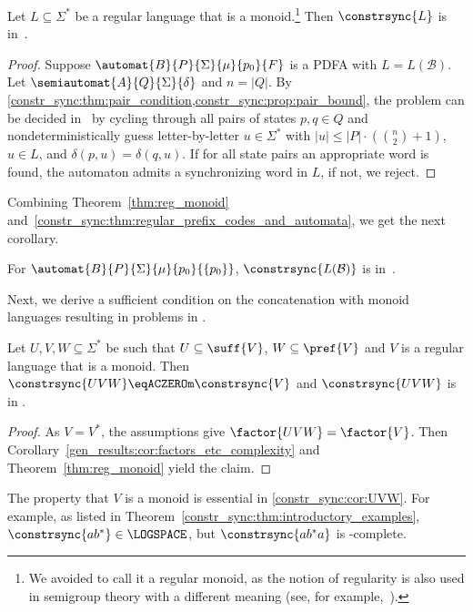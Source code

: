 \begin{theorem}
	\label{thm:reg_monoid}
	Let $L \subseteq \Sigma^*$ be a regular language that is a monoid.\footnote{We avoided to call 
		it a regular monoid, as the notion of regularity is also used in semigroup theory with a different meaning (see, for example,~\cite{howie1995fundamentals}).}
	Then $\constrsync{L}$
	is in~\NL. 
\end{theorem} 
\begin{proof} 
	Suppose $\automat{B}{P}{\Sigma}{\mu}{p_0}{F}$ is a PDFA with $L = L(\mathcal B)$.
	Let $\semiautomat{A}{Q}{\Sigma}{\delta}$
	and $n = |Q|$.
	By \cref{constr_sync:thm:pair_condition,constr_sync:prop:pair_bound},
	the problem can be decided in \NL\ 
	by cycling through all pairs of states $p,q \in Q$
	and nondeterministically guess letter-by-letter
	$u \in \Sigma^*$ with $|u| \le |P|\cdot ( \binom{n}{2} + 1 )$, $u \in L$,
	and $\delta(p, u) = \delta(q, u)$.
	If for all state pairs an appropriate word is found,
	the automaton admits a synchronizing word in $L$, if not, we reject.
\end{proof} 

Combining Theorem~\ref{thm:reg_monoid} and~\ref{constr_sync:thm:regular_prefix_codes_and_automata},
we get the next corollary.

\begin{corollary}
	\label{constr_syn:cor:start_equals_final_state}
	For $\automat{B}{P}{\Sigma}{\mu}{p_0}{\{p_0\}}$,
	$\constrsync{L(\mathcal B)}$ is in~\NL.
\end{corollary}

Next, we derive a sufficient condition on the concatenation with monoid
languages resulting in problems in \NL.

\begin{corollary}
	\label{constr_sync:cor:UVW}
	Let $U,V, W \subseteq \Sigma^*$ be such that 
	$U \subseteq \suff{V}$, $W \subseteq \pref{V}$
	and $V$ is a regular language that is a monoid.
	Then 
	$
	\constrsync{UVW} \eqACZEROm \constrsync{V}
	$
	and $\constrsync{UVW}$ is in \NL.
\end{corollary}
\begin{proof}
	As $V = V^*$, the assumptions give $\factor{UVW} = \factor{V}$. Then 
	Corollary~\ref{gen_results:cor:factors_etc_complexity} and Theorem~\ref{thm:reg_monoid} yield the claim.
\end{proof}

The property that $V$ is a monoid is essential in \cref{constr_sync:cor:UVW}.
For example, as listed in Theorem~\ref{constr_sync:thm:introductory_examples},
$\constrsync{ab^*} \in \LOGSPACE$,
but $\constrsync{ab^*a}$ is \NP-complete.

